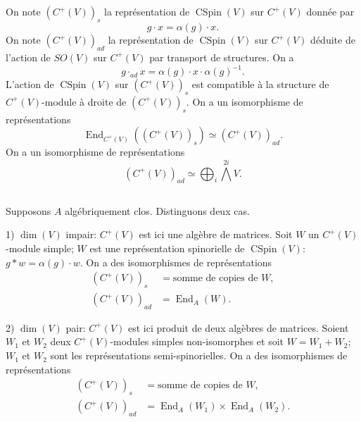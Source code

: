 \documentclass[11pt]{amsart}
\theoremstyle{plain}
\theoremstyle{definition}
\theoremstyle{remark}
\begin{document}
\subsection*{}
On note $(C^+(V))_s$ la repr\'esentation de $\operatorname{CSpin}(V)$ sur $C^+(V)$ donn\'ee par
\begin{equation}\label{eq:3.3.1}
g\cdot x=\alpha(g)\cdot x.
\end{equation}
On note $(C^+(V))_{ad}$ la repr\'esentation de $\operatorname{CSpin}(V)$ sur $C^+(V)$ d\'eduite de l'action de $SO(V)$ sur $C^+(V)$ par transport de structures. On a
\begin{equation}\label{eq:3.3.2}
g\cdot_{ad}x=\alpha(g)\cdot x\cdot\alpha(g)^{-1}.
\end{equation}
L'action de $\operatorname{CSpin}(V)$ sur $(C^+(V))_s$ est compatible \`a la structure de $C^+(V)$-module \`a droite de $(C^+(V))_s$. On a un isomorphisme de repr\'esentations
\begin{equation}\label{eq:3.3.3}
\operatorname{End}_{C^+(V)}((C^+(V))_s)\simeq(C^+(V))_{ad}.
\end{equation}
On a un isomorphisme de repr\'esentations
\begin{equation}\label{eq:3.3.4}
(C^+(V))_{ad}\simeq\bigoplus_{i}\overset{2i}{\bigwedge}V.
\end{equation}

\subsection*{}
Supposons $A$ alg\'ebriquement clos. Distinguons deux cas.

1) $\dim(V)$ impair: $C^+(V)$ est ici une alg\`ebre de matrices. Soit $W$ un $C^+(V)$-module simple; $W$ est une repr\'esentation spinorielle de $\operatorname{CSpin}(V)$: $g*w=\alpha(g)\cdot w$. On a des isomorphismes de repr\'esentations
\begin{align}
\label{eq:3.4.1}(C^+(V))_s&=\text{somme de copies de }W,\\
\label{eq:3.4.2}(C^+(V))_{ad}&=\operatorname{End}_A(W).
\end{align}

2) $\dim(V)$ pair: $C^+(V)$ est ici produit de deux alg\`ebres de matrices. Soient $W_1$ et $W_2$ deux $C^+(V)$-modules simples non-isomorphes et soit $W=W_1+W_2$; $W_1$ et $W_2$ sont les repr\'esentations semi-spinorielles. On a des isomorphismes de repr\'esentations
\begin{align}
\label{eq:3.4.3}(C^+(V))_s&=\text{somme de copies de }W,\\
\label{eq:3.4.4}(C^+(V))_{ad}&=\operatorname{End}_A(W_1)\times\operatorname{End}_A(W_2).
\end{align}
\end{document}
